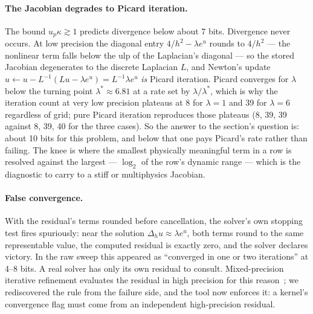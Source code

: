 \documentclass[11pt]{article}
\begin{document}
\paragraph{The Jacobian degrades to Picard iteration.} The bound
$u_p\kappa \gtrsim 1$ predicts divergence below about 7 bits. Divergence never
occurs.
At low precision the diagonal entry $4/h^2 - \lambda e^{u}$ rounds to $4/h^2$
--- the nonlinear term falls below the ulp of the Laplacian's diagonal --- so the
stored Jacobian degenerates to the discrete Laplacian $L$, and Newton's update
$u \leftarrow u - L^{-1}(Lu - \lambda e^u) = L^{-1}\lambda e^u$ \emph{is} Picard
iteration. Picard converges for $\lambda$ below the turning point
$\lambda^* \approx 6.81$ at a rate set by $\lambda/\lambda^*$, which is why the
iteration count at very low precision plateaus at 8 for $\lambda=1$ and 39 for
$\lambda=6$ regardless of grid; pure Picard iteration reproduces those plateaus
(8, 39, 39 against 8, 39, 40 for the three cases). So the answer to the
section's question is: about 10 bits for this
problem, and below that one pays Picard's rate rather than failing. The knee is
where the smallest physically meaningful term in a row is resolved against the
largest --- $\log_2$ of the row's dynamic range --- which is the diagnostic to
carry to a stiff or multiphysics Jacobian.

\paragraph{False convergence.} With the residual's terms rounded before
cancellation, the solver's own stopping test fires spuriously: near the solution
$\Delta_h u \approx \lambda e^u$, both terms round to the same representable
value, the computed residual is exactly zero, and the solver declares victory.
In the raw sweep this appeared as ``converged in one or two iterations'' at 4--8
bits. A real solver has only its own residual to consult. Mixed-precision
iterative refinement evaluates the residual in high precision for this
reason~\cite{carsonhigham}; we rediscovered the rule from the failure side, and
the tool now enforces it: a kernel's convergence flag must come from an
independent high-precision residual.
\end{document}
